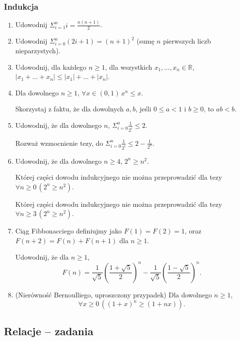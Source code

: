 \documentclass[12pt]{article}
\newcommand{\bR}{\mathbb{R}}
\begin{document}
\subsubsection{Indukcja}\label{ss:indukcja}
\begin{enumerate}
	\item Udowodnij $\Sigma_{i=1}^n i = \frac{n(n+1)}{2}$. 
	\item Udowodnij $\Sigma_{i=0}^n (2i+1) = (n+1)^2$
	(sumę $n$ pierwszych liczb nieparzystych).
	\item Udowodnij, dla każdego $n\geq 1$, dla wszystkich $x_1,\dots, x_n\in \bR$, $|x_1 + ... + x_n| \leq  |x_1| + ... + |x_n|$.
	\item 
	Dla dowolnego  $n\geq 1$, $\forall x \in (0,1)\, x^n \leq  x$.
	
	Skorzystaj z faktu, że dla dowolnych $a,b$, jeśli $0\leq a < 1$ i $b\geq 0$, to $ab<b$.
	
	\item 
	Udowodnij, że dla dowolnego $n$, $\Sigma_{i=0}^n \frac{1}{2^i} \leq 2$.
	
	Rozważ wzmocnienie  tezy, 
	do $\Sigma_{i=0}^n \frac{1}{2^i} \leq 2-\frac{1}{2^{n}}$.
	
	\item \label{ind:2nn2} Udowodnij, że dla dowolnego $n\geq 4$, $2^n\geq  n^2$.
	
	Której części dowodu indukcyjnego nie można przeprowadzić 
	dla tezy $\forall n\geq 0\, (2^n\geq n^2)$.
	
	Której części dowodu indukcyjnego nie można przeprowadzić 
	dla tezy $\forall n\geq 3\, (2^n\geq n^2)$.
	
	\item Ciąg Fibbonacciego definiujmy jako 
	$F(1)=F(2)=1$, oraz $F(n+2)=F(n)+F(n+1)$ dla $n\geq 1$.
	
	
	Udowodnij, że dla $n\geq 1$, 
	$$
	F(n)=\frac{1}{\sqrt{5}}\left(\frac{1+\sqrt{5}}{2}\right)^n- 
	\frac{1}{\sqrt{5}}\left(\frac{1-\sqrt{5}}{2}\right)^n.
	$$
	
	\item 
	(Nierówność  Bernoulliego,  uproszczony przypadek) Dla dowolnego $n\geq 1$, 
	\[
	\forall x \geq 0\, ((1+x)^n \geq (1+nx)).
	\]
	
\end{enumerate}


\subsection{Relacje -- zadania}
\end{document}
